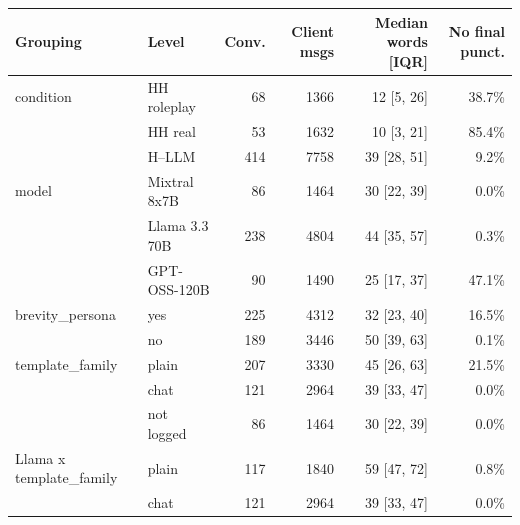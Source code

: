 \begin{tabular}{llrrrr}
\toprule
Grouping & Level & Conv. & Client msgs & Median words [IQR] & No final punct. \\
\midrule
condition & HH roleplay & 68 & 1366 & 12 [5, 26] & 38.7\% \\
 & HH real & 53 & 1632 & 10 [3, 21] & 85.4\% \\
 & H--LLM & 414 & 7758 & 39 [28, 51] & 9.2\% \\
model & Mixtral 8x7B & 86 & 1464 & 30 [22, 39] & 0.0\% \\
 & Llama 3.3 70B & 238 & 4804 & 44 [35, 57] & 0.3\% \\
 & GPT-OSS-120B & 90 & 1490 & 25 [17, 37] & 47.1\% \\
brevity\_persona & yes & 225 & 4312 & 32 [23, 40] & 16.5\% \\
 & no & 189 & 3446 & 50 [39, 63] & 0.1\% \\
template\_family & plain & 207 & 3330 & 45 [26, 63] & 21.5\% \\
 & chat & 121 & 2964 & 39 [33, 47] & 0.0\% \\
 & not logged & 86 & 1464 & 30 [22, 39] & 0.0\% \\
Llama x template\_family & plain & 117 & 1840 & 59 [47, 72] & 0.8\% \\
 & chat & 121 & 2964 & 39 [33, 47] & 0.0\% \\
\bottomrule
\end{tabular}
